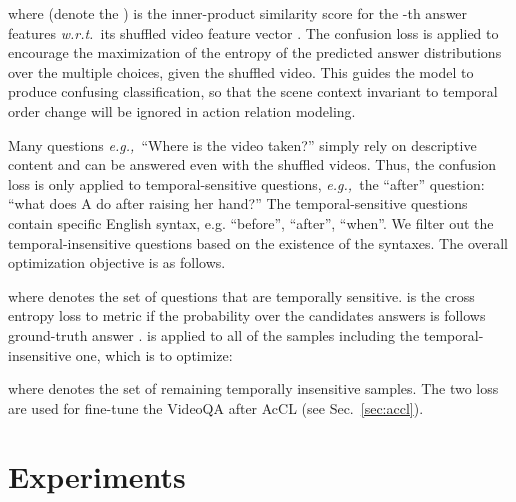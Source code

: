 \documentclass[sigconf]{acmart}
\newcommand{\eg}{\emph{e.g.,~}}
\newcommand{\wrt}{\emph{w.r.t.~}}
\begin{document}
where  (denote the ) is the inner-product similarity score for the -th answer features  \wrt its shuffled video feature vector .
The confusion loss is applied to encourage the maximization of the entropy of the predicted answer distributions over the multiple choices, given the shuffled video. This guides the model to produce confusing classification,
so that the scene context invariant to temporal order change will be ignored in action relation modeling. 





Many questions \eg ``Where is the video taken?'' simply rely on descriptive content and can be answered even with the shuffled videos. 
Thus, the confusion loss is only applied to temporal-sensitive questions, \eg the ``after'' question: ``what does A do after raising her hand?''
The temporal-sensitive questions contain specific English syntax, e.g. “before”, “after”, “when”. We filter out the temporal-insensitive questions based on the existence of the syntaxes.
The overall optimization objective is as follows.

where  denotes the set of questions that are temporally sensitive.   is the cross entropy loss to metric if the probability over the candidates answers is  follows ground-truth answer .
 is applied to all of the samples including the temporal-insensitive one, which is to optimize:

where  denotes the set of remaining temporally insensitive samples.
The two loss are used for fine-tune the VideoQA after AcCL (see Sec.~\ref{sec:accl}).



 \section{Experiments}
\end{document}
